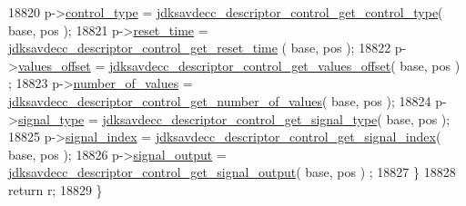 \begin{DoxyCode}
18820         p->\hyperlink{structjdksavdecc__descriptor__control_affec595f0ec2a4ae7a3cece71d05adcb}{control\_type} = 
      \hyperlink{group__descriptor__control_gab56d5f84488a18312975c02d942d4b12}{jdksavdecc\_descriptor\_control\_get\_control\_type}( base, pos );
18821         p->\hyperlink{structjdksavdecc__descriptor__control_a8fb66f63094794fbbdacc69af5cc55fa}{reset\_time} = \hyperlink{group__descriptor__control_ga2b5a7307d31d9b5f707c88101aeedc62}{jdksavdecc\_descriptor\_control\_get\_reset\_time}
      ( base, pos );
18822         p->\hyperlink{structjdksavdecc__descriptor__control_a2987071ee0b81f35817e48a0dc92ad76}{values\_offset} = 
      \hyperlink{group__descriptor__control_gaf173ce05404df247991fdcf4d8c91d6f}{jdksavdecc\_descriptor\_control\_get\_values\_offset}( base, pos )
      ;
18823         p->\hyperlink{structjdksavdecc__descriptor__control_a1c32421ead62b8a032c4346688cd9b69}{number\_of\_values} = 
      \hyperlink{group__descriptor__control_ga1e94b730b6e00d604c5d9745c1adfd2b}{jdksavdecc\_descriptor\_control\_get\_number\_of\_values}( base,
       pos );
18824         p->\hyperlink{structjdksavdecc__descriptor__control_a248e60ef99d5ed1779989d1dd6b6dc5a}{signal\_type} = 
      \hyperlink{group__descriptor__control_gaee48af3d9860a1005188a96e5987d934}{jdksavdecc\_descriptor\_control\_get\_signal\_type}( base, pos );
18825         p->\hyperlink{structjdksavdecc__descriptor__control_ae2e81a95ee9ad83f1fe22b6a1ee29075}{signal\_index} = 
      \hyperlink{group__descriptor__control_ga134e360ffd3c714e3ad9fc77bbc00700}{jdksavdecc\_descriptor\_control\_get\_signal\_index}( base, pos );
18826         p->\hyperlink{structjdksavdecc__descriptor__control_ab4b91864e6fc335d7e86536d9f4461e4}{signal\_output} = 
      \hyperlink{group__descriptor__control_ga49525851775e5480cb7914b29d9f7f78}{jdksavdecc\_descriptor\_control\_get\_signal\_output}( base, pos )
      ;
18827     \}
18828     \textcolor{keywordflow}{return} r;
18829 \}
\end{DoxyCode}


